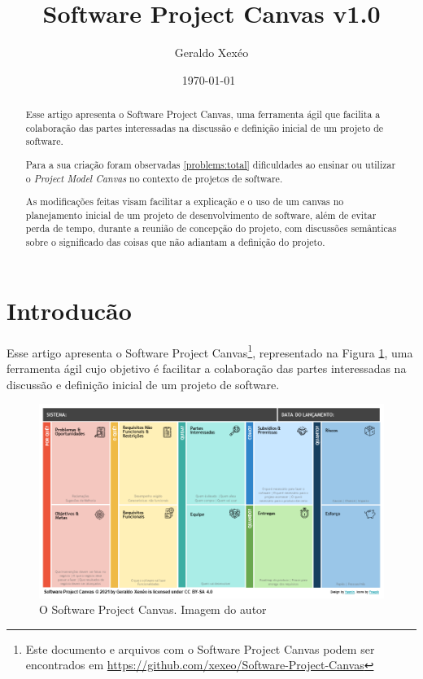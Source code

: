 \documentclass[a4]{report}
\title{Software Project Canvas v1.0}
\author{Geraldo Xexéo}
\date{\today \ \DTMcurrenttime }
\begin{document}
\maketitle

\begin{abstract}
\hspace*{\parindent}Esse artigo apresenta o Software Project Canvas, uma ferramenta ágil que facilita a colaboração das partes interessadas na  discussão e definição inicial de um projeto de software.

Para a sua  criação foram observadas \ref{problems:total} dificuldades  ao ensinar ou utilizar o \textit{Project Model Canvas} no contexto de projetos de software.

As modificações feitas visam facilitar a explicação e o uso de um canvas no planejamento inicial de um projeto de desenvolvimento de software, além de evitar perda de tempo, durante a reunião de concepção do projeto, com discussões semânticas sobre o significado das coisas que não adiantam a definição do projeto.
\end{abstract}

\tableofcontents
\listoffigures

\newpage

\section{Introducão}

Esse artigo apresenta o Software Project Canvas\footnote{Este documento e arquivos com o Software Project Canvas podem ser encontrados em \url{https://github.com/xexeo/Software-Project-Canvas}}, representado na Figura \ref{fig:spc}, uma ferramenta ágil cujo objetivo é facilitar a colaboração das partes interessadas na  discussão e definição inicial de um projeto de software.

\begin{figure}[hbt]
    \centering
    \includegraphics[width=\textwidth]{imagens/Software Project Canvas Yasmin 1.png}
    \caption{O Software Project Canvas. Imagem do autor}
    \label{fig:spc}
\end{figure}
\end{document}
